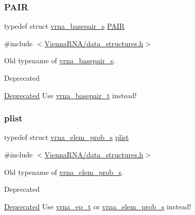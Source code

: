 \subsubsection{\texorpdfstring{P\+A\+IR}{PAIR}}
{\footnotesize\ttfamily typedef struct \hyperlink{group__data__structures_structvrna__basepair__s}{vrna\+\_\+basepair\+\_\+s} \hyperlink{group__data__structures_ga4381025ffbd692e54189b2c679c79c99}{P\+A\+IR}}



{\ttfamily \#include $<$\hyperlink{data__structures_8h}{Vienna\+R\+N\+A/data\+\_\+structures.\+h}$>$}



Old typename of \hyperlink{group__data__structures_structvrna__basepair__s}{vrna\+\_\+basepair\+\_\+s}. 

\begin{DoxyRefDesc}{Deprecated}
\item[\hyperlink{deprecated__deprecated000047}{Deprecated}]Use \hyperlink{group__data__structures_gac8c5669d3fb813cacf506489689305ce}{vrna\+\_\+basepair\+\_\+t} instead! \end{DoxyRefDesc}
\mbox{\label{group__data__structures_ga9608eed021ebfbdd7a901cfdc446c8e9}} 
\subsubsection{\texorpdfstring{plist}{plist}}
{\footnotesize\ttfamily typedef struct \hyperlink{group__struct__utils_structvrna__elem__prob__s}{vrna\+\_\+elem\+\_\+prob\+\_\+s} \hyperlink{group__data__structures_ga9608eed021ebfbdd7a901cfdc446c8e9}{plist}}



{\ttfamily \#include $<$\hyperlink{data__structures_8h}{Vienna\+R\+N\+A/data\+\_\+structures.\+h}$>$}



Old typename of \hyperlink{group__struct__utils_structvrna__elem__prob__s}{vrna\+\_\+elem\+\_\+prob\+\_\+s}. 

\begin{DoxyRefDesc}{Deprecated}
\item[\hyperlink{deprecated__deprecated000048}{Deprecated}]Use \hyperlink{group__struct__utils_gab9ac98ab55ded9fb90043b024b915aca}{vrna\+\_\+ep\+\_\+t} or \hyperlink{group__struct__utils_structvrna__elem__prob__s}{vrna\+\_\+elem\+\_\+prob\+\_\+s} instead! \end{DoxyRefDesc}
\mbox{\label{group__data__structures_ga8412f116a2eb07b59ade9e14ca7c5ef1}} 
